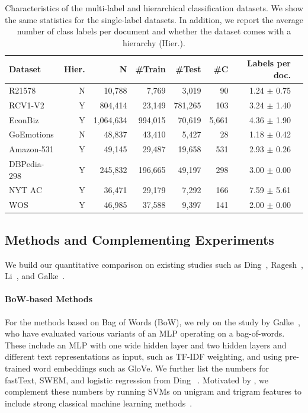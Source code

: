 \documentclass[lettersize,journal]{IEEEtran}
\begin{document}
\begin{table}[ht]
    \centering
    \caption{Characteristics of the multi-label and hierarchical classification datasets. 
    We show the same statistics for the single-label datasets.
    In addition, we report the average number of class labels per document and whether the dataset comes with a hierarchy (Hier.).
    }
    \label{tab:multilabeldatasets}
    \begin{tabular}{lrrrrrrr}
    \toprule
    \textbf{Dataset} & \textbf{Hier.} & \textbf{N} & \textbf{\#Train} & \textbf{\#Test} & \textbf{\#C}  & \textbf{Labels per doc.} \\    
    \midrule                                                               
    R21578   & N & 10,788  & 7,769  & 3,019 & 90  &  1.24 $\pm$ 0.75   \\ 
    RCV1-V2  & Y   &  804,414  & 23,149   & 781,265 & 103  & 3.24 $\pm$ 1.40  \\ 
    EconBiz  &  Y & 1,064,634  & 994,015  & 70,619 & 5,661  & 4.36 $\pm$ 1.90  \\ 
    GoEmotions  & N  & 48,837  & 43,410  & 5,427 & 28   & 1.18 $\pm$ 0.42   \\ 
    Amazon-531  &  Y   & 49,145  &  29,487  &  19,658  & 531 & 2.93 $\pm$ 0.26  \\  
    DBPedia-298  &  Y   &  245,832  &  196,665  & 49,197 & 298   & 3.00 $\pm$ 0.00\\ 
    NYT AC  & Y   &  36,471  & 29,179    & 7,292 & 166 &  7.59 $\pm$ 5.61  \\   
    WOS & Y & 46,985 & 37,588 & 9,397 & 141 & 2.00 $\pm$ 0.00\\
   \bottomrule
    \end{tabular}
\end{table}

\subsection{Methods and Complementing Experiments}

We build our quantitative comparison on existing studies such as Ding~\etal\cite{DBLP:conf/emnlp/DingWLLL20}, Ragesh~\etal\cite{DBLP:conf/wsdm/RageshSIBL21}, Li~\etal\cite{DBLP:journals/corr/abs-2405-11524}, and Galke~\etal\cite{galkescherp-acl2022}.

\paragraph{BoW-based Methods}
For the methods based on Bag of Words (BoW), we rely on the study by Galke~\etal\cite{galkescherp-acl2022}, who have evaluated various variants of an MLP operating on a bag-of-words.
These include an MLP with one wide hidden layer
 and two hidden layers and different text representations as input, such as TF-IDF weighting, and using pre-trained word embeddings such as GloVe.
We further list the numbers for fastText, SWEM, and logistic regression from Ding \etal~\cite{DBLP:conf/emnlp/DingWLLL20}.
Motivated by \cite{DBLP:journals/corr/abs-2211-02563}, we complement these numbers by running SVMs on unigram and trigram features to include strong classical machine learning methods~\cite{DBLP:conf/kcap/GalkeMSBS17}.
\end{document}
